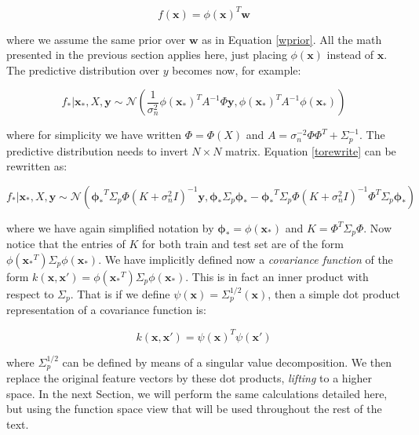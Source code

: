\documentclass[10pt,a4paper,twoside]{book}
\begin{document}
\begin{equation}
f(\boldsymbol{x}) = \phi(\boldsymbol{x})^T \boldsymbol{w}
\end{equation}

where we assume the same prior over $\boldsymbol{w}$ as in Equation \ref{wprior}. All the math presented in the previous section applies here, just placing $\phi(\boldsymbol{x})$ instead of $\boldsymbol{x}$. The predictive distribution over $y$ becomes now, for example:

\begin{equation}
\label{torewrite}
f_{*}|\boldsymbol{x}_{*}, X, \boldsymbol{y} \sim \mathcal{N}\left( \dfrac{1}{\sigma^2_n}\phi(\boldsymbol{x_*})^T A^{-1}\Phi \boldsymbol{y}, \phi(\boldsymbol{x_*})^T A^{-1}\phi(\boldsymbol{x_*})    \right)
\end{equation}

where for simplicity we have written $\Phi = \Phi(X)$ and $A = \sigma_n^{-2}\Phi\Phi^T + \Sigma_p^{-1}$. The predictive distribution needs to invert $N \times N$ matrix. Equation \ref{torewrite} can be rewritten as:

\begin{equation}
f_{*}|\boldsymbol{x}_{*}, X, \boldsymbol{y} \sim \mathcal{N}\left(\boldsymbol{\phi_*}^T\Sigma_p\Phi(K + \sigma^2_n I)^{-1}\boldsymbol{y}, \boldsymbol{\phi_*}\Sigma_p\boldsymbol{\phi_*} - \boldsymbol{\phi_*}^T\Sigma_p\Phi(K + \sigma^2_n I)^{-1}\Phi^T\Sigma_p\boldsymbol{\phi_*}\right)
\end{equation}

where we have again simplified notation by $\boldsymbol{\phi_*} = \phi(\boldsymbol{x_*})$ and $K = \Phi^T\Sigma_p\Phi$. Now notice that the entries of $K$ for both train and test set are of the form  $\phi(\boldsymbol{x_*}^T)\Sigma_p\phi(\boldsymbol{x_*})$. We have implicitly defined now a \textit{covariance function} of the form $k(\boldsymbol{x}, \boldsymbol{x'}) = \phi(\boldsymbol{x_*}^T)\Sigma_p\phi(\boldsymbol{x_*})$. This is in fact an inner product with respect to $\Sigma_p$. That is if we define $\psi(\boldsymbol{x}) = \Sigma_p^{1/2}(\boldsymbol{x})$, then a simple dot product representation of a covariance function is:

\begin{equation}
k(\boldsymbol{x}, \boldsymbol{x'}) = \psi(\boldsymbol{x})^T\psi(\boldsymbol{x'})
\end{equation}

where $\Sigma_p^{1/2}$ can be defined by means of a singular value decomposition. We then replace the original feature vectors by these dot products, \textit{lifting} to a higher space. In the next Section, we will perform the same calculations detailed here, but using the function space view that will be used throughout the rest of the text.
\end{document}
